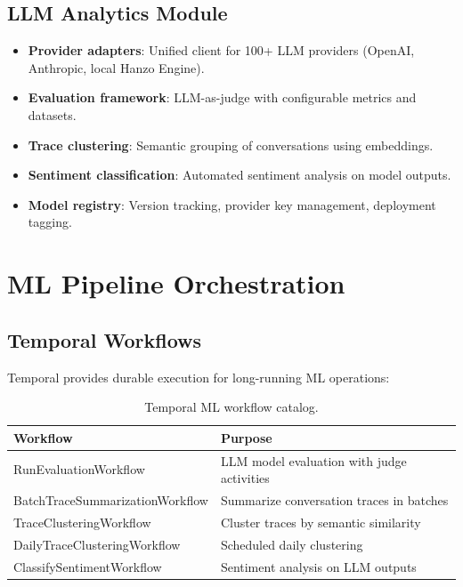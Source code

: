 \documentclass[11pt,letterpaper]{article}
\begin{document}
\subsection{LLM Analytics Module}

\begin{itemize}
\item \textbf{Provider adapters}: Unified client for 100+ LLM providers (OpenAI, Anthropic, local Hanzo Engine).
\item \textbf{Evaluation framework}: LLM-as-judge with configurable metrics and datasets.
\item \textbf{Trace clustering}: Semantic grouping of conversations using embeddings.
\item \textbf{Sentiment classification}: Automated sentiment analysis on model outputs.
\item \textbf{Model registry}: Version tracking, provider key management, deployment tagging.
\end{itemize}

\section{ML Pipeline Orchestration}

\subsection{Temporal Workflows}

Temporal provides durable execution for long-running ML operations:

\begin{table}[H]
\centering
\small
\begin{tabular}{@{}lp{5.5cm}@{}}
\toprule
\textbf{Workflow} & \textbf{Purpose} \\
\midrule
RunEvaluationWorkflow & LLM model evaluation with judge activities \\
BatchTraceSummarizationWorkflow & Summarize conversation traces in batches \\
TraceClusteringWorkflow & Cluster traces by semantic similarity \\
DailyTraceClusteringWorkflow & Scheduled daily clustering \\
ClassifySentimentWorkflow & Sentiment analysis on LLM outputs \\
\bottomrule
\end{tabular}
\caption{Temporal ML workflow catalog.}
\label{tab:temporal-workflows}
\end{table}
\end{document}
